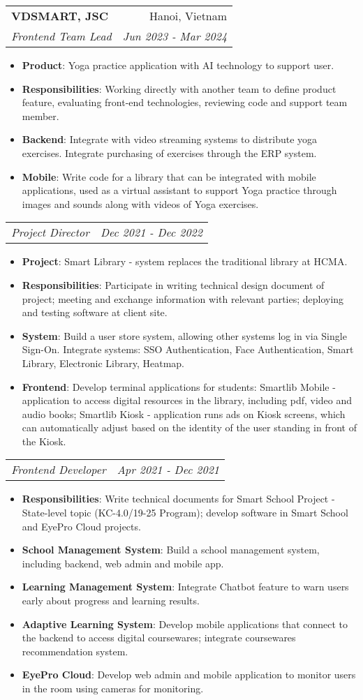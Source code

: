 \documentclass[letterpaper,11pt]{article}
\makeatletter
\newcommand{\resumeItem}[2]{
  \item\small{
    \textbf{#1}{: #2 \vspace{-2pt}}
  }
}
\newcommand{\resumeSubheading}[4]{
  \vspace{-1pt}\item
    \begin{tabular*}{0.97\textwidth}{l@{\extracolsep{\fill}}r}
      \textbf{#1} & #2 \\
      \textit{\small#3} & \textit{\small #4} \\
    \end{tabular*}\vspace{-5pt}
}
\newcommand{\resumeSubtitle}[2]{
  \vspace{-1pt}
    \begin{tabular*}{0.97\textwidth}
    {l@{\extracolsep{\fill}}r}
      \textit{\small#1} & \textit{\small #2} \\
    \end{tabular*}\vspace{-5pt}
}
\newcommand{\resumeItemListStart}{\begin{itemize}}
\newcommand{\resumeItemListEnd}{\end{itemize}\vspace{-5pt}}
\makeatother
\begin{document}
    \resumeSubheading
      {VDSMART, JSC}{Hanoi, Vietnam}
      {Frontend Team Lead}{Jun 2023 - Mar 2024}
      \resumeItemListStart
        \resumeItem{Product}
          {Yoga practice application with AI technology to support user.}
        \resumeItem{Responsibilities}
          {Working directly with another team to define product feature, evaluating front-end technologies, reviewing code and support team member.}
        \resumeItem{Backend}
          {Integrate with video streaming systems to distribute yoga exercises. Integrate purchasing of exercises through the ERP system.}
        \resumeItem{Mobile}
          {Write code for a library that can be integrated with mobile applications, used as a virtual assistant to support Yoga practice through images and sounds along with videos of Yoga exercises.}
      \resumeItemListEnd
    \resumeSubtitle
      {Project Director}{Dec 2021 - Dec 2022}
      \resumeItemListStart
        \resumeItem{Project}
          {Smart Library - system replaces the traditional library at HCMA.}
        \resumeItem{Responsibilities}
          {Participate in writing technical design document of project; meeting and exchange information with relevant parties; deploying and testing software at client site.}
        \resumeItem{System}
          {Build a user store system, allowing other systems log in via Single Sign-On. Integrate systems: SSO Authentication, Face Authentication, Smart Library, Electronic Library, Heatmap.}
        \resumeItem{Frontend}
          {Develop terminal applications for students: Smartlib Mobile - application to access digital resources in the library, including pdf, video and audio books; Smartlib Kiosk - application runs ads on Kiosk screens, which can automatically adjust based on the identity of the user standing in front of the Kiosk.}
      \resumeItemListEnd
    \resumeSubtitle
      {Frontend Developer}{Apr 2021 - Dec 2021}
      \resumeItemListStart
        \resumeItem{Responsibilities}
          {Write technical documents for Smart School Project - State-level topic (KC-4.0/19-25 Program); develop software in Smart School and EyePro Cloud projects.}
        \resumeItem{School Management System}
          {Build a school management system, including backend, web admin and mobile app.}
        \resumeItem{Learning Management System}
          {Integrate Chatbot feature to warn users early about progress and learning results.}
        \resumeItem{Adaptive Learning System}
          {Develop mobile applications that connect to the backend to access digital coursewares; integrate coursewares recommendation system.}
        \resumeItem{EyePro Cloud}
          {Develop web admin and mobile application to monitor users in the room using cameras for monitoring.}
      \resumeItemListEnd
\end{document}
